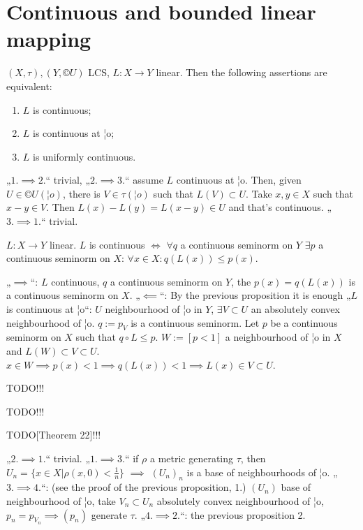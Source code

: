 \documentclass[12pt]{article}					%
\begin{document}
\section{Continuous and bounded linear mapping}
\begin{tvrzeni}
	$(X, τ), (Y, ©U)$ LCS, $L: X \rightarrow Y$ linear. Then the following assertions are equivalent:
	\begin{enumerate}
		\item $L$ is continuous;
		\item $L$ is continuous at ¦o;
		\item $L$ is uniformly continuous.
	\end{enumerate}

	\begin{dukazin}
		„$1. \implies 2.$“ trivial, „$2. \implies 3.$“ assume $L$ continuous at ¦o. Then, given $U \in ©U(¦o)$, there is $V \in τ(¦o)$ such that $L(V) \subset U$. Take $x, y \in X$ such that $x - y \in V$. Then $L(x) - L(y) = L(x - y) \in U$ and that's continuous. „$3. \implies 1.$“ trivial.
	\end{dukazin}
\end{tvrzeni}

\begin{tvrzeni}
	$L: X \rightarrow Y$ linear. $L$ is continuous $\Leftrightarrow$ $\forall q$ a continuous seminorm on $Y$ $\exists p$ a continuous seminorm on $X$: $\forall x \in X: q(L(x)) ≤ p(x)$.

	\begin{dukazin}
		„$\implies$“: $L$ continuous, $q$ a continuous seminorm on $Y$, the $p(x) = q(L(x))$ is a continuous seminorm on $X$. „$\impliedby$“: By the previous proposition it is enough „$L$ is continuous at ¦o“: $U$ neighbourhood of ¦o in $Y$, $\exists V \subset U$ an absolutely convex neighbourhood of ¦o. $q:=p_V$ is a continuous seminorm. Let $p$ be a continuous seminorm on $X$ such that $q ∘ L ≤ p$. $W := [p < 1]$ a neighbourhood of ¦o in $X$ and $L(W) \subset V \subset U$. $x \in W \implies p(x) < 1 \implies q(L(x)) < 1 \implies L(x) \in V \subset U$.
	\end{dukazin}
\end{tvrzeni}


TODO!!!


TODO!!!

\begin{veta}
	TODO[Theorem 22]!!!


	\begin{dukazin}
		„$2. \implies 1.$“ trivial. „$1. \implies 3.$“ if $ρ$ a metric generating $τ$, then $U_n = \{x \in X | ρ(x, 0) < \frac{1}{n}\}$ $\implies$ $(U_n)_n$ is a base of neighbourhoods of ¦o. „$3. \implies 4.$“: (see the proof of the previous proposition, 1.) $(U_n)$ base of neighbourhood of ¦o, take $V_n \subset U_n$ absolutely convex neighbourhood of ¦o, $p_n = p_{V_n} \implies (p_n)$ generate $τ$. „$4. \implies 2.$“: the previous proposition 2.
	\end{dukazin}
\end{veta}
\end{document}
